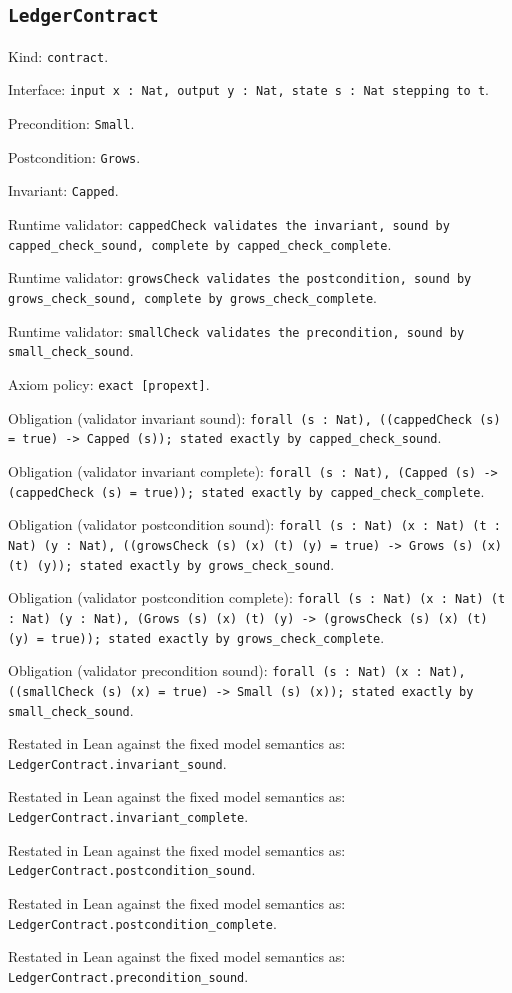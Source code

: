 \documentclass[11pt]{article}
\begin{document}
\subsection*{\texttt{LedgerContract}}
\noindent Kind: \texttt{contract}.\par
\noindent Interface: \texttt{input x : Nat, output y : Nat, state s : Nat stepping to t}.\par
\noindent Precondition: \texttt{Small}.\par
\noindent Postcondition: \texttt{Grows}.\par
\noindent Invariant: \texttt{Capped}.\par
\noindent Runtime validator: \texttt{cappedCheck validates the invariant, sound by capped\_check\_sound, complete by capped\_check\_complete}.\par
\noindent Runtime validator: \texttt{growsCheck validates the postcondition, sound by grows\_check\_sound, complete by grows\_check\_complete}.\par
\noindent Runtime validator: \texttt{smallCheck validates the precondition, sound by small\_check\_sound}.\par
\noindent Axiom policy: \texttt{exact [propext]}.\par
\noindent Obligation (validator invariant sound): \texttt{forall (s : Nat), ((cappedCheck (s) = true) -> Capped (s)); stated exactly by capped\_check\_sound}.\par
\noindent Obligation (validator invariant complete): \texttt{forall (s : Nat), (Capped (s) -> (cappedCheck (s) = true)); stated exactly by capped\_check\_complete}.\par
\noindent Obligation (validator postcondition sound): \texttt{forall (s : Nat) (x : Nat) (t : Nat) (y : Nat), ((growsCheck (s) (x) (t) (y) = true) -> Grows (s) (x) (t) (y)); stated exactly by grows\_check\_sound}.\par
\noindent Obligation (validator postcondition complete): \texttt{forall (s : Nat) (x : Nat) (t : Nat) (y : Nat), (Grows (s) (x) (t) (y) -> (growsCheck (s) (x) (t) (y) = true)); stated exactly by grows\_check\_complete}.\par
\noindent Obligation (validator precondition sound): \texttt{forall (s : Nat) (x : Nat), ((smallCheck (s) (x) = true) -> Small (s) (x)); stated exactly by small\_check\_sound}.\par
\noindent Restated in Lean against the fixed model semantics as: \texttt{LedgerContract.invariant\_sound}.\par
\noindent Restated in Lean against the fixed model semantics as: \texttt{LedgerContract.invariant\_complete}.\par
\noindent Restated in Lean against the fixed model semantics as: \texttt{LedgerContract.postcondition\_sound}.\par
\noindent Restated in Lean against the fixed model semantics as: \texttt{LedgerContract.postcondition\_complete}.\par
\noindent Restated in Lean against the fixed model semantics as: \texttt{LedgerContract.precondition\_sound}.\par
\end{document}
